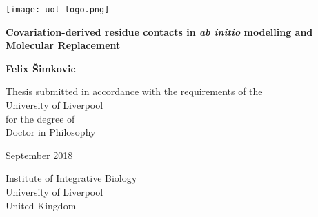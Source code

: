 \begin{titlepage}
    \begin{center}
        \vspace{1cm}
        
        \texttt{[image: uol\_logo.png]}
        
        \vspace{1cm}

        \Huge
        \textbf{Covariation-derived residue contacts in \textit{ab initio} modelling and Molecular Replacement}
        
        \vspace{1.5cm}
        
        \huge
        \textbf{Felix \v{S}imkovic}
        
        \vfill

        \Large
        Thesis submitted in accordance with the requirements of the \\
        University of Liverpool\\
        for the degree of\\
        Doctor in Philosophy
        
        \vspace{1.0cm}

        September 2018

        \vspace{1.0cm}
        
        \Large
        Institute of Integrative Biology\\
        University of Liverpool\\
        United Kingdom
        
    \end{center}
\end{titlepage}
